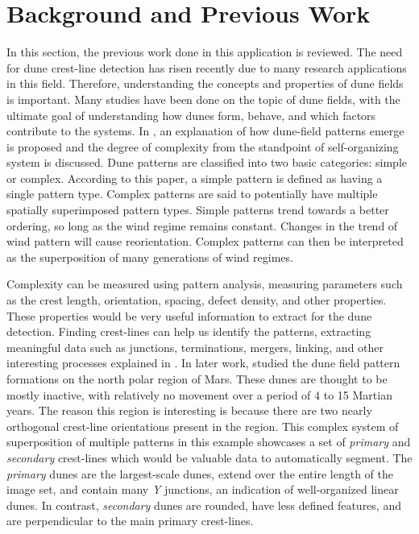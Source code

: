 \section{Background and Previous Work} \label{sec:background_perious_work}

In this section, the previous work done in this application is reviewed. The need for dune crest-line detection has risen recently due to many research applications in this field. Therefore, understanding the concepts and properties of dune fields is important. Many studies have been done on the topic of dune fields, with the ultimate goal of understanding how dunes form, behave, and which factors contribute to the systems. In \cite{Kocurek_Ewing}, an explanation of how dune-field patterns emerge is proposed and the degree of complexity from the standpoint of self-organizing system is discussed. Dune patterns are classified into two basic categories: simple or complex. According to this paper, a simple pattern is defined as having a single pattern type. Complex patterns are said to potentially have multiple spatially superimposed pattern types. Simple patterns trend towards a better ordering, so long as the wind regime remains constant. Changes in the trend of wind pattern will cause reorientation. Complex patterns can then be interpreted as the superposition of many generations of wind regimes.

Complexity can be measured using pattern analysis, measuring parameters such as the crest length, orientation, spacing,	defect density, and other properties. These properties would be very useful information to extract for the dune detection. Finding crest-lines	can help us identify the patterns, extracting meaningful data such as junctions, terminations, mergers, linking, and other interesting processes explained in \cite{Kocurek_Ewing}. In later work, \cite{Ewing_Peyret_Kocurek_Bourke} studied the dune field pattern formations on the north polar region of Mars. These dunes are thought to be mostly inactive, with relatively no movement over a period of 4 to 15 Martian years. The reason this region is interesting is because there are two nearly orthogonal crest-line orientations present in the region. This complex system of superposition of multiple patterns in this example showcases a set of \emph{primary} and \emph{secondary} crest-lines which would be valuable data to automatically segment. The \emph{primary}	dunes are the largest-scale dunes, extend over the entire length of the image set, and contain many \emph{Y} junctions, an indication of well-organized linear dunes. In contrast, \emph{secondary} dunes are rounded, have less defined features, and are perpendicular to the main primary crest-lines.

